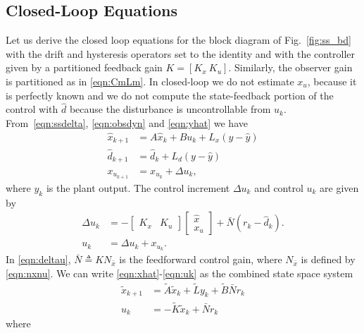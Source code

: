 \documentclass[twocolumn,twoside]{IEEEtran}
\newcommand{\x}{\ensuremath{x }\xspace}
\begin{document}
\subsection{Closed-Loop Equations}
Let us derive the closed loop equations for the block diagram of Fig.~\ref{fig:ss_bd} with the drift and hysteresis operators set to the identity and with the controller given by a partitioned feedback gain ${K = [K_x\: K_u]}$. Similarly, the observer gain is partitioned as in \eqref{eqn:CmLm}.
In closed-loop we do not estimate $\x_u$, because it is perfectly known and we do not compute the state-feedback portion of the control with $\hat d$ because the disturbance is uncontrollable from $u_k$.  
From~\eqref{eqn:ssdelta}, \eqref{eqn:obsdyn} and \eqref{eqn:yhat} we have
\begin{align}
  \hat{\x}_{k+1} &= A \hat{x}_k + Bu_k + L_x(y - \hat{y})\label{eqn:xhat}\\
  \hat{d}_{k+1}  &= \hat{d}_k  + L_d (y - \hat{y}) \label{eqn:dhat}\\
  x_{u_{k+1}}     &= x_{u_k}  + \Delta{u}_k,\label{eqn:xu}
\end{align}
where $y_k$ is the plant output. The control increment $\Delta u_k$ and control $u_k$ are given by
\begin{align}
  \Delta u_k &= -\begin{bmatrix}
    K_x & K_u
  \end{bmatrix}
  \begin{bmatrix}
    \hat{\x} \\ x_u
  \end{bmatrix}
  +
               \bar{N}(r_k - \hat{d}_k).\label{eqn:deltau}\\
  u_k &= \Delta u_k + x_{u_k}\label{eqn:uk}.
\end{align}
In \eqref{eqn:deltau}, $\bar{N}\triangleq KN_{\bar{x}}$ is the feedforward control gain, where $N_{\bar{x}}$ is defined by \eqref{eqn:nxnu}.
We can write \eqref{eqn:xhat}-\eqref{eqn:uk} as the combined state space system
\begin{align}
\tilde{\x}_{k+1} &= \tilde{A}\tilde{\x}_k + \tilde{L}y_k + \tilde{B}\bar{N}r_k\label{eqn:cntrldyn}\\
u_k &= -\tilde{K}\tilde{\x}_k + \bar{N} r_k \label{eqn:ukx}
\end{align}
where
\end{document}
